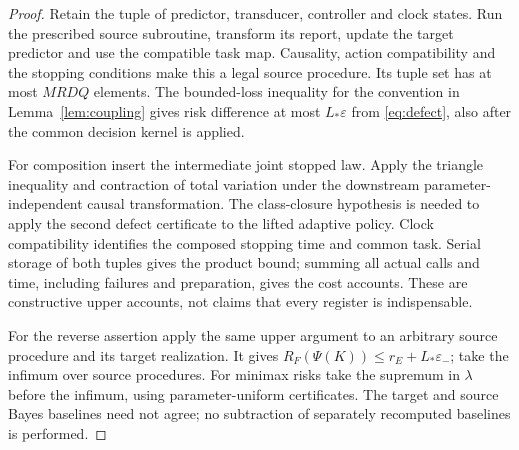 \begin{proof}
Retain the tuple of predictor, transducer, controller and clock states. Run the prescribed source subroutine, transform its report, update the target predictor and use the compatible task map. Causality, action compatibility and the stopping conditions make this a legal source procedure. Its tuple set has at most $MRDQ$ elements. The bounded-loss inequality for the convention in Lemma~\ref{lem:coupling} gives risk difference at most $L_*\varepsilon$ from \eqref{eq:defect}, also after the common decision kernel is applied.

For composition insert the intermediate joint stopped law. Apply the triangle inequality and contraction of total variation under the downstream parameter-independent causal transformation. The class-closure hypothesis is needed to apply the second defect certificate to the lifted adaptive policy. Clock compatibility identifies the composed stopping time and common task. Serial storage of both tuples gives the product bound; summing all actual calls and time, including failures and preparation, gives the cost accounts. These are constructive upper accounts, not claims that every register is indispensable.

For the reverse assertion apply the same upper argument to an arbitrary source procedure and its target realization. It gives $R_F(\Psi(K))\le r_E+L_*\varepsilon_-$; take the infimum over source procedures. For minimax risks take the supremum in $\lambda$ before the infimum, using parameter-uniform certificates. The target and source Bayes baselines need not agree; no subtraction of separately recomputed baselines is performed.
\end{proof}

